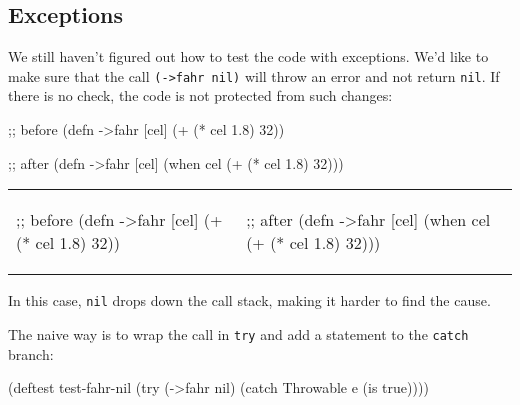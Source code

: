 \subsection{Exceptions}


We still haven't figured out how to test the code with exceptions. We'd like to make sure that the call \verb|(->fahr nil)| will throw an error and not return \verb|nil|. If there is no check, the code is not protected from such changes:

\ifx\DEVICETYPE\MOBILE

\begin{english}
  \begin{clojure}
;; before
(defn ->fahr [cel]
  (+ (* cel 1.8) 32))
  \end{clojure}

\splitter

  \begin{clojure}
;; after
(defn ->fahr [cel]
  (when cel
    (+ (* cel 1.8) 32)))
  \end{clojure}
\end{english}

\else

\begin{english}

\noindent
\begin{tabular}{ @{}p{5cm} @{}p{5cm} }


  \begin{clojure}
;; before
(defn ->fahr [cel]
  (+ (* cel 1.8) 32))
  \end{clojure}

&

  \begin{clojure}
;; after
(defn ->fahr [cel]
  (when cel
    (+ (* cel 1.8) 32)))
  \end{clojure}

\end{tabular}

\end{english}

\fi


\noindent
In this case, \verb|nil| drops down the call stack, making it harder to find the cause.

The naive way is to wrap the call in \verb|try| and add a statement to the \verb|catch| branch:

\begin{english}
  \begin{clojure}
(deftest test-fahr-nil
  (try
    (->fahr nil)
    (catch Throwable e
      (is true))))
  \end{clojure}
\end{english}

